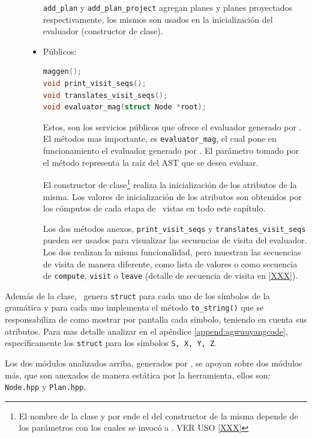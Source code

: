 \begin{description}
\begin{itemize}
\texttt{add\_plan} y \texttt{add\_plan\_project} agregan planes y planes proyectados respectivamente, los mismos son usados en la inicialización del evaluador (constructor de clase).

\item Públicos:

\begin{lstlisting}[basicstyle=\scriptsize, backgroundcolor=\color{white}, language=c++, columns=fullflexible, linewidth=6cm]
maggen();
void print_visit_seqs();
void translates_visit_seqs();
void evaluator_mag(struct Node *root);
\end{lstlisting}
\vspace{0.3cm}

Estos, son los servicios públicos que ofrece el evaluador generado por \maggen. El métodos mas importante, es \texttt{evaluator\_mag}, el cual pone en funcionamiento el evaluador generado por \maggen. El parámetro tomado por el método representa la raíz del AST que se desea evaluar.

El constructor de clase\footnote{El nombre de la clase y por ende el del constructor de la misma depende de los parámetros con los cuales se invocó a \maggen. VER USO \ref{XXX}} realiza la inicialización de los atributos de la misma. Los valores de inicialización de los atributos son obtenidos por los cómputos de cada etapa de \maggen\ vistas en todo este capítulo.

Los dos métodos anexos, \texttt{print\_visit\_seqs} y \texttt{translates\_visit\_seqs} pueden ser usados para visualizar las secuencias de visita del evaluador. Los dos realizan la misma funcionalidad, pero muestran las secuencias de visita de manera diferente, como lista de valores o como secuencia de \texttt{compute}, \texttt{visit} o \texttt{leave} (detalle de secuencia de visita en \ref{XXX}).
\end{itemize}
\end{description}

Además de la clase, \maggen\ genera \texttt{struct} para cada uno de los símbolos de la gramática y para cada uno implementa el método \texttt{to\_string()} que se responsabiliza de como mostrar por pantalla cada símbolo, teniendo en cuenta sus atributos. Para mas detalle analizar en el apéndice \ref{append:agwuuyangcode}, específicamente los \texttt{struct} para los símbolos \texttt{S, X, Y, Z}.

Los dos módulos analizados arriba, generados por \maggen, se apoyan sobre dos módulos más, que son anexados de manera estática por la herramienta, ellos son: \texttt{Node.hpp} y \texttt{Plan.hpp}.

